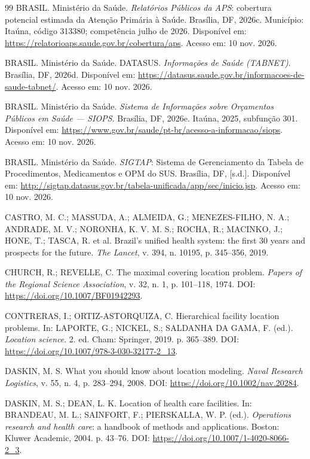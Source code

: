 \documentclass[12pt,a4paper,oneside]{report}
\begin{document}
\begin{thebibliography}{99}
BRASIL. Ministério da Saúde. \textit{Relatórios Públicos da APS}: cobertura potencial estimada da Atenção Primária à Saúde. Brasília, DF, 2026c. Município: Itaúna, código 313380; competência julho de 2026. Disponível em: \url{https://relatorioaps.saude.gov.br/cobertura/aps}. Acesso em: 10 nov. 2026.

BRASIL. Ministério da Saúde. DATASUS. \textit{Informações de Saúde (TABNET)}. Brasília, DF, 2026d. Disponível em: \url{https://datasus.saude.gov.br/informacoes-de-saude-tabnet/}. Acesso em: 10 nov. 2026.

BRASIL. Ministério da Saúde. \textit{Sistema de Informações sobre Orçamentos Públicos em Saúde --- SIOPS}. Brasília, DF, 2026e. Itaúna, 2025, subfunção 301. Disponível em: \url{https://www.gov.br/saude/pt-br/acesso-a-informacao/siops}. Acesso em: 10 nov. 2026.

BRASIL. Ministério da Saúde. \textit{SIGTAP}: Sistema de Gerenciamento da Tabela de Procedimentos, Medicamentos e OPM do SUS. Brasília, DF, [s.d.]. Disponível em: \url{http://sigtap.datasus.gov.br/tabela-unificada/app/sec/inicio.jsp}. Acesso em: 10 nov. 2026.

CASTRO, M. C.; MASSUDA, A.; ALMEIDA, G.; MENEZES-FILHO, N. A.; ANDRADE, M. V.; NORONHA, K. V. M. S.; ROCHA, R.; MACINKO, J.; HONE, T.; TASCA, R. et al. Brazil's unified health system: the first 30 years and prospects for the future. \textit{The Lancet}, v. 394, n. 10195, p. 345--356, 2019.

CHURCH, R.; REVELLE, C. The maximal covering location problem. \textit{Papers of the Regional Science Association}, v. 32, n. 1, p. 101--118, 1974. DOI: \url{https://doi.org/10.1007/BF01942293}.

CONTRERAS, I.; ORTIZ-ASTORQUIZA, C. Hierarchical facility location problems. In: LAPORTE, G.; NICKEL, S.; SALDANHA DA GAMA, F. (ed.). \textit{Location science}. 2. ed. Cham: Springer, 2019. p. 365--389. DOI: \url{https://doi.org/10.1007/978-3-030-32177-2_13}.

DASKIN, M. S. What you should know about location modeling. \textit{Naval Research Logistics}, v. 55, n. 4, p. 283--294, 2008. DOI: \url{https://doi.org/10.1002/nav.20284}.

DASKIN, M. S.; DEAN, L. K. Location of health care facilities. In: BRANDEAU, M. L.; SAINFORT, F.; PIERSKALLA, W. P. (ed.). \textit{Operations research and health care}: a handbook of methods and applications. Boston: Kluwer Academic, 2004. p. 43--76. DOI: \url{https://doi.org/10.1007/1-4020-8066-2_3}.


\end{thebibliography}
\end{document}
